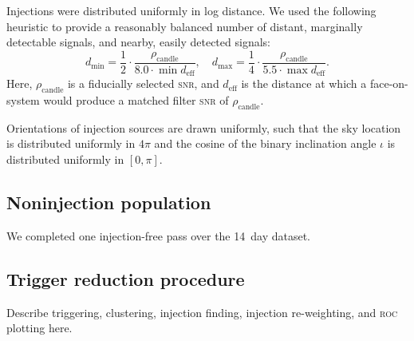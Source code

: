 Injections were distributed uniformly in log distance.  We used the following heuristic to provide a reasonably balanced number of distant, marginally detectable signals, and nearby, easily detected signals:
$$
d_\mathrm{min} = \frac{1}{2} \cdot \frac{\rho_\mathrm{candle}}{8.0 \cdot \min {d_\mathrm{eff}}}, \quad
d_\mathrm{max} = \frac{1}{4} \cdot \frac{\rho_\mathrm{candle}}{5.5 \cdot \max {d_\mathrm{eff}}}.
$$
Here, $\rho_\mathrm{candle}$ is a fiducially selected \textsc{snr}, and $d_\mathrm{eff}$ is the distance at which a face-on-system would produce a matched filter \textsc{snr} of $\rho_\mathrm{candle}$.

Orientations of injection sources are drawn uniformly, such that the sky location is distributed uniformly in $4\pi$ and the cosine of the binary inclination angle $\iota$ is distributed uniformly in $[0, \pi]$.

\subsection{Noninjection population}

We completed one injection-free pass over the 14~day dataset. 

\subsection{Trigger reduction procedure}
 
{\color{red} Describe triggering, clustering, injection finding, injection re-weighting, and \textsc{roc} plotting here.}

